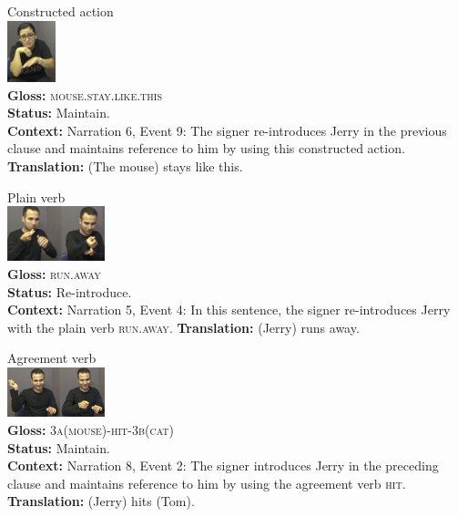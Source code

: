 \documentclass[]{elsarticle} %
\begin{document}
\begin{exe}
\ex
\begin{xlist}
\ex \label{ex:5a} Constructed action \\\glll
{} \includegraphics[width=40pt]{pictures/p10.png} \\ \textbf{Gloss:} \textsc{mouse.stay.like.this} \\ 
\textbf{Status:} Maintain. \\
\glt \textbf{Context:} Narration 6, Event 9: The signer re-introduces Jerry in the previous clause and maintains reference to him by using this constructed action.
\glt \textbf{Translation:} (The mouse) stays like this.
\vspace{0.35cm}

\ex \label{ex:5b} Plain verb \\\glll
{} \includegraphics[width=80pt]{pictures/p11.png} \\ \textbf{Gloss:} \textsc{run.away} \\ 
\textbf{Status:} Re-introduce. \\
\glt \textbf{Context:} Narration 5, Event 4: In this sentence, the signer re-introduces Jerry with the plain verb \textsc{run.away}.
\glt \textbf{Translation:} (Jerry) runs away.
\vspace{0.35cm}

\ex \label{ex:5c} Agreement verb \\\glll
{} \includegraphics[width=80pt]{pictures/p12.png} \\ \textbf{Gloss:} \textsc{3a(mouse)-hit-3b(cat)} \\ 
\textbf{Status:} Maintain. \\
\glt \textbf{Context:} Narration 8, Event 2: The signer introduces Jerry in the preceding clause and maintains reference to him by using the agreement verb \textsc{hit}.
\glt \textbf{Translation:} (Jerry) hits (Tom).
\vspace{0.35cm}

\end{xlist}
\end{exe}
\end{document}
